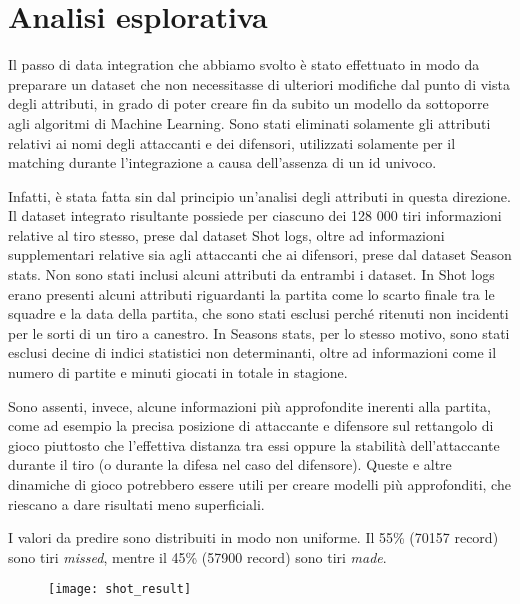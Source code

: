 \section{Analisi esplorativa}

Il passo di data integration che abbiamo svolto è stato effettuato in modo da preparare un dataset che non necessitasse di ulteriori modifiche dal punto di vista degli attributi, in grado di poter creare fin da subito un modello da sottoporre agli algoritmi di Machine Learning. Sono stati eliminati solamente gli attributi relativi ai nomi degli attaccanti e dei difensori, utilizzati solamente per il matching durante l’integrazione a causa dell’assenza di un id univoco.

\par
Infatti, è stata fatta sin dal principio un’analisi degli attributi in questa direzione. Il dataset integrato risultante possiede per ciascuno dei 128 000 tiri informazioni relative al tiro stesso, prese dal dataset Shot logs, oltre ad informazioni supplementari relative sia agli attaccanti che ai difensori, prese dal dataset Season stats. Non sono stati inclusi alcuni attributi da entrambi i dataset. In Shot logs erano presenti alcuni attributi riguardanti la partita come lo scarto finale tra le squadre e la data della partita, che sono stati esclusi perché ritenuti non incidenti per le sorti di un tiro a canestro. In Seasons stats, per lo stesso motivo, sono stati esclusi decine di indici statistici non determinanti, oltre ad informazioni come il numero di partite e minuti giocati in totale in stagione.

\par
Sono assenti, invece, alcune informazioni più approfondite inerenti alla partita, come ad esempio la precisa posizione di attaccante e difensore sul rettangolo di gioco piuttosto che l’effettiva distanza tra essi oppure la stabilità dell’attaccante durante il tiro (o durante la difesa nel caso del difensore). Queste e altre dinamiche di gioco potrebbero essere utili per creare modelli più approfonditi, che riescano a dare risultati meno superficiali.

\par
I valori da predire sono distribuiti in modo non uniforme. Il 55\% (70157 record) sono tiri \textit{missed}, mentre il 45\% (57900 record) sono tiri \textit{made}. 


\begin{figure}
\fontsize{9pt}{1em}
	\texttt{[image: shot\_result]}
\end{figure}